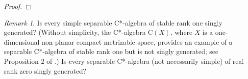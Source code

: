 \documentclass[12pt, oneside, psamsfonts]{amsart}
\theoremstyle{definition}
\theoremstyle{remark}
\newtheorem{rem}[thm]{Remark}
\numberwithin{equation}{section}
\newcommand{\Comp}{\mathbb C}
\begin{document}
\begin{proof}
%
%
%
%
%
%
%
%
\end{proof}

\begin{rem}
Is every simple separable C*-algebra of stable rank one singly generated? (Without simplicity, the C*-algebra $\mathrm{C}(X)$, where $X$ is a one-dimensional non-planar compact metrizable space, provides an example of a separable C*-algebra of stable rank one but is not singly generated; see Proposition 2 of \cite{Nagisa-04}.) Is every separable C*-algebra (not necessarily simple) of real rank zero singly generated? 
\end{rem}
\end{document}
